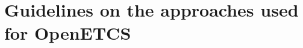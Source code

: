 
\section{Guidelines on the approaches used for OpenETCS}


\begin{comment}
This section will be written for the final version of the document, after the approach and tools tio  use during the project will be selected.
\end{comment}

